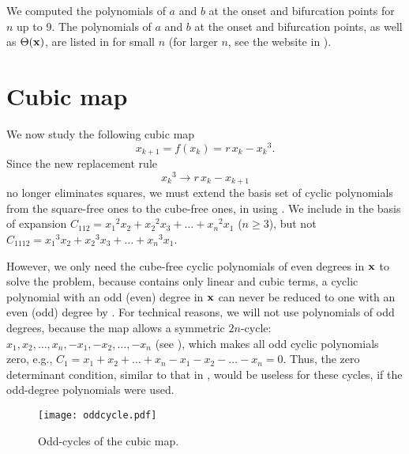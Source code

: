 \documentclass{ws-ijbc}
\begin{document}
We computed the polynomials of $a$ and $b$
  at the onset and bifurcation points for $n$ up to 9.
The polynomials of $a$ and $b$
  at the onset and bifurcation points,
  as well as $\Theta(\mathbf{x})$,
  are listed in  for small $n$
(for larger $n$, see the website in ).





\section{\label{sec:cubic}Cubic map}


We now study the following cubic map \cite{strogatz}
\begin{equation}
  x_{k + 1} = f(x_k) = r \, x_k - {x_k}^3.
\label{eq:cubic}
\end{equation}
Since the new replacement rule
\begin{equation}
  {x_k}^3 \rightarrow r \, x_k - x_{k+1}
\label{eq:cubreplace}
\end{equation}
no longer eliminates squares,
%
we must extend the basis set of cyclic polynomials
  from the square-free ones to the cube-free ones,
  in using .
We include in the basis of expansion
  $C_{112} = {x_1}^2 x_2 + {x_2}^2 x_3 + \dots + {x_n}^2 x_1$ ($n\ge3$),
but not
  $C_{1112} = {x_1}^3 x_2 + {x_2}^3 x_3 + \dots + {x_n}^3 x_1$.

%
However, we only need the cube-free cyclic polynomials of even degrees in $\mathbf{x}$
to solve the problem,
%
because  contains only linear and cubic terms,
a cyclic polynomial with an odd (even) degree in $\mathbf{x}$
can never be reduced to one with an even (odd) degree
by .
%
%
For technical reasons, we will not use polynomials of odd degrees,
because the map allows a symmetric $2n$-cycle:
$x_1, x_2, \ldots, x_n, -x_1, -x_2, \ldots, -x_n$
(see ),
which makes all odd cyclic polynomials zero,
e.g., $C_1 = x_1 + x_2 + \dots + x_n - x_1 - x_2 - \dots - x_n = 0$.
%
Thus, the zero determinant condition, similar to that in ,
  would be useless for these cycles,
  if the odd-degree polynomials were used.



\begin{figure}[h]
  \begin{minipage}{\linewidth}
    \begin{center}
        \texttt{[image: oddcycle.pdf]}
    \end{center}
  \end{minipage}%
  \caption{\label{fig:oddcycle}
  Odd-cycles of the cubic map.}
\end{figure}
\end{document}
